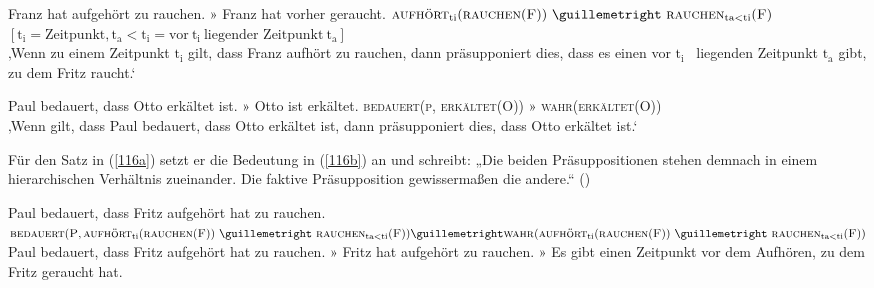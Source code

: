 \begin{exe}
	\ex\label{114} 
		\begin{xlist}	
			\ex\label{114a} Franz hat aufgehört zu rauchen. » Franz hat vorher geraucht.
			\ex\label{114b} $\textrm{\textsc{aufhört}}_{\textrm{ti}}(\textrm{\textsc{rauchen}(\textsc{F}))} \ » \ \textrm{\textsc{rauchen}}_{\textrm{ta} < \textrm{ti}}(\textrm{\textsc{F}})$ \\
			$[\textrm{t}_{\textrm{i}} = \text{Zeitpunkt}, \textrm{t}_{\textrm{a}} < \textrm{t}_{\textrm{i}} = \text{vor} \ \textrm{t}_{\textrm{i}} \ \text{liegender Zeitpunkt} \ \textrm{t}_{\textrm{a}}]$ \\
			‚Wenn zu einem Zeitpunkt $\textrm{t}_{\textrm{i}}$ gilt, dass Franz aufhört zu rauchen, dann präsupponiert dies, dass es einen vor $\textrm{t}_{\textrm{i}}$ \ liegenden Zeitpunkt $\textrm{t}_{\textrm{a}}$ gibt, zu dem Fritz raucht.‘
		\end{xlist}
\end{exe}

\begin{exe}
	\ex\label{115} 
		\begin{xlist}	
			\ex\label{115a} Paul bedauert, dass Otto erkältet ist. » Otto ist erkältet.
			\ex\label{115b} \textsc{bedauert}(\textsc{p}, \textsc{erkältet}(\textsc{O})) » \textsc{wahr}(\textsc{erkältet}(\textsc{O}))\\
			‚Wenn gilt, dass Paul bedauert, dass Otto erkältet ist, dann präsupponiert dies, dass Otto erkältet ist.‘
			\hfill\hbox{\citet[421]{Rinas2007}}
		\end{xlist}
\end{exe}	  
Für den Satz in (\ref{116a}) setzt er die Bedeutung in (\ref{116b}) an und schreibt: „Die beiden Präsuppositionen  stehen demnach in einem hierarchischen Verhältnis zueinander. Die faktive Präsupposition  gewissermaßen die andere.“ (\citealt[421]{Rinas2007})

\begin{exe}
	\ex\label{116} 
		\begin{xlist}	
			\ex\label{116a} Paul bedauert, dass Fritz aufgehört hat zu rauchen.
			\ex\label{116b} $\textrm{\textsc{bedauert}}(\textrm{\textsc{P}}, \text{\textsc{aufhört}}_{\textrm{ti}}(\textrm{\textsc{rauchen}(\textsc{F}))} \  » \  \textrm{\textsc{rauchen}}_{\textrm{ta} < \textrm{ti}}(\textrm{\textsc{F}}))\\ 
			» \textrm{\textsc{wahr}}(\textrm{\textsc{aufhört}}_{\textrm{ti}}(\textrm{\textsc{rauchen}(\textsc{F}))} \ » \ \textrm{\textsc{rauchen}}_{\textrm{ta} < \textrm{ti}}(\textrm{\textsc{F}}))$\hbox{}\hfill\hbox{\citet[421]{Rinas2007}}\\
			Paul bedauert, dass Fritz aufgehört hat zu rauchen. » Fritz hat aufgehört zu rauchen. » Es gibt einen Zeitpunkt vor dem Aufhören, zu dem Fritz geraucht hat.
		\end{xlist}
\end{exe}

